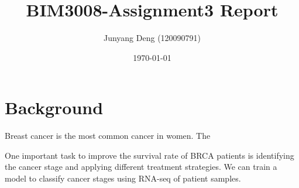 \documentclass{article}
\title{BIM3008-Assignment3 Report}
\author{Junyang Deng (120090791)}
\date{\today}
\begin{document}
 
\maketitle

\section{Background}

Breast cancer is the most common cancer in women. The

One important task to improve the survival rate of BRCA patients is
identifying the cancer stage and applying different treatment
strategies. We can train a model to classify cancer stages using RNA-seq
of patient samples.
\end{document}
